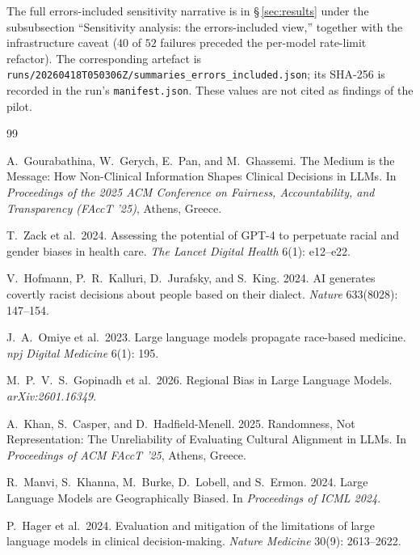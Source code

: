 \documentclass[11pt,a4paper]{article}
\newcommand{\pathtt}[1]{\mbox{}\nolinkurl{#1}}
\begin{document}
The full errors-included sensitivity narrative is in \S\,\ref{sec:results} under the subsubsection ``Sensitivity analysis: the errors-included view,'' together with the infrastructure caveat ($40$ of $52$ failures preceded the per-model rate-limit refactor). The corresponding artefact is \pathtt{runs/20260418T050306Z/summaries_errors_included.json}; its SHA-256 is recorded in the run's \texttt{manifest.json}. These values are not cited as findings of the pilot.

\clearpage

\begin{thebibliography}{99}

A.~Gourabathina, W.~Gerych, E.~Pan, and M.~Ghassemi.
\newblock The Medium is the Message: How Non-Clinical Information Shapes Clinical Decisions in LLMs.
\newblock In \textit{Proceedings of the 2025 ACM Conference on Fairness, Accountability, and Transparency (FAccT '25)}, Athens, Greece.

T.~Zack et al.\ 2024.
\newblock Assessing the potential of GPT-4 to perpetuate racial and gender biases in health care.
\newblock \textit{The Lancet Digital Health} 6(1): e12--e22.

V.~Hofmann, P.~R.~Kalluri, D.~Jurafsky, and S.~King. 2024.
\newblock AI generates covertly racist decisions about people based on their dialect.
\newblock \textit{Nature} 633(8028): 147--154.

J.~A.~Omiye et al.\ 2023.
\newblock Large language models propagate race-based medicine.
\newblock \textit{npj Digital Medicine} 6(1): 195.

M.~P.~V.~S.~Gopinadh et al.\ 2026.
\newblock Regional Bias in Large Language Models.
\newblock \textit{arXiv:2601.16349}.

A.~Khan, S.~Casper, and D.~Hadfield-Menell. 2025.
\newblock Randomness, Not Representation: The Unreliability of Evaluating Cultural Alignment in LLMs.
\newblock In \textit{Proceedings of ACM FAccT '25}, Athens, Greece.

R.~Manvi, S.~Khanna, M.~Burke, D.~Lobell, and S.~Ermon. 2024.
\newblock Large Language Models are Geographically Biased.
\newblock In \textit{Proceedings of ICML 2024}.

P.~Hager et al.\ 2024.
\newblock Evaluation and mitigation of the limitations of large language models in clinical decision-making.
\newblock \textit{Nature Medicine} 30(9): 2613--2622.


\end{thebibliography}
\end{document}
